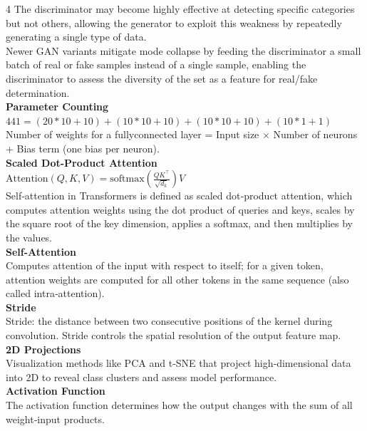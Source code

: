 \documentclass[8pt]{extarticle}
\begin{document}
\begin{multicols}{4}
The discriminator may become highly effective at detecting specific categories but not others, allowing the generator to exploit this weakness by repeatedly generating a single type of data.\\
Newer GAN variants mitigate mode collapse by feeding the discriminator a small batch of real or fake samples instead of a single sample, enabling the discriminator to assess the diversity of the set as a feature for real/fake determination.\\
\vspace{2pt}\textbf{Parameter Counting}\\
$441 = (20*10 + 10) + (10*10 + 10) + (10*10 + 10) + (10*1 + 1)$\\
Number of weights for a fully\-connected layer = Input size $\times$ Number of neurons + Bias term (one bias per neuron).\\
\vspace{2pt}\textbf{Scaled Dot-Product Attention}\\
$\text{Attention}(Q, K, V) = \text{softmax}\!\left(\frac{Q K^{\top}}{\sqrt{d_k}}\right) V$\\
Self‑attention in Transformers is defined as scaled dot‑product attention, which computes attention weights using the dot product of queries and keys, scales by the square root of the key dimension, applies a softmax, and then multiplies by the values.\\
\vspace{2pt}\textbf{Self-Attention}\\
Computes attention of the input with respect to itself; for a given token, attention weights are computed for all other tokens in the same sequence (also called intra‑attention).\\
\vspace{2pt}\textbf{Stride}\\
Stride: the distance between two consecutive positions of the kernel during convolution. Stride controls the spatial resolution of the output feature map.\\
\vspace{2pt}\textbf{2D Projections}\\
Visualization methods like PCA and t‑SNE that project high‑dimensional data into 2D to reveal class clusters and assess model performance.\\
\vspace{2pt}\textbf{Activation Function}\\
The activation function determines how the output changes with the sum of all weight‑input products.\\

\end{multicols}
\end{document}
